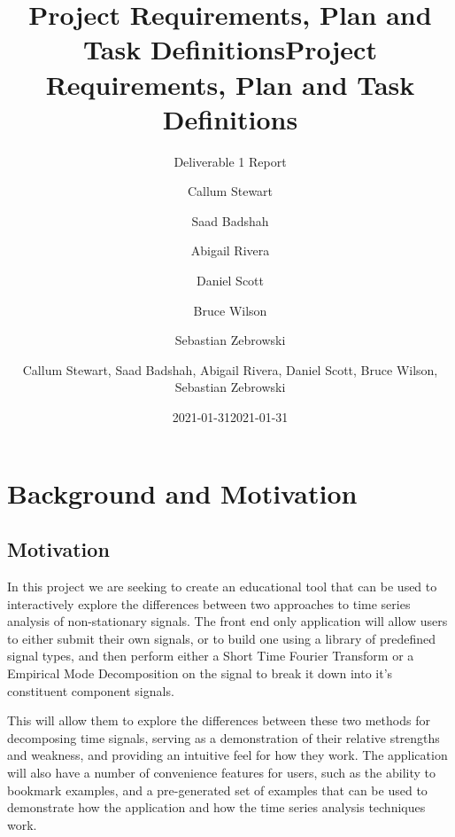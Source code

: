 \documentclass[
  english,
  paper=a4,
  oneside  ,captions=tableheading
]{scrbook}
\title{Project Requirements, Plan and Task Definitions}
\subtitle{Deliverable 1 Report}
\author{Callum Stewart \and Saad Badshah \and Abigail Rivera \and Daniel
Scott \and Bruce Wilson \and Sebastian Zebrowski}
\date{2021-01-31}
\title{Project Requirements, Plan and Task Definitions}
\author{Callum Stewart, Saad Badshah, Abigail Rivera, Daniel
Scott, Bruce Wilson, Sebastian Zebrowski}
\date{2021-01-31}
\begin{document}
\begin{titlepage}
\afterpage{\restorepagecolor}
\newcommand{\colorRule}[3][black]{\textcolor[HTML]{#1}{\rule{#2}{#3}}}
\end{titlepage}
\restoregeometry



\tableofcontents
\newpage

\hypertarget{background-and-motivation}{%
\section{Background and Motivation}\label{background-and-motivation}}

\hypertarget{motivation}{%
\subsection{Motivation}\label{motivation}}

In this project we are seeking to create an educational tool that can be
used to interactively explore the differences between two approaches to
time series analysis of non-stationary signals. The front end only
application will allow users to either submit their own signals, or to
build one using a library of predefined signal types, and then perform
either a Short Time Fourier Transform or a Empirical Mode Decomposition
on the signal to break it down into it's constituent component signals.

This will allow them to explore the differences between these two
methods for decomposing time signals, serving as a demonstration of
their relative strengths and weakness, and providing an intuitive feel
for how they work. The application will also have a number of
convenience features for users, such as the ability to bookmark
examples, and a pre-generated set of examples that can be used to
demonstrate how the application and how the time series analysis
techniques work.
\end{document}
